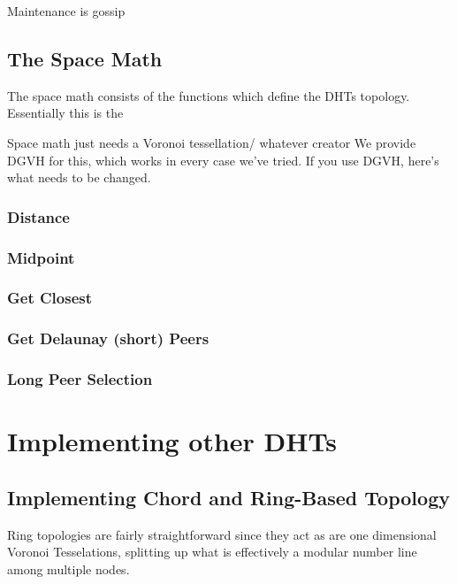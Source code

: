 \documentclass[11pt,conference]{IEEEtran}
\begin{document}
	Maintenance is gossip
	\subsection{The Space Math}
	The space math consists of the functions which define the DHTs topology.
	Essentially this is the
	
	Space math just needs a Voronoi tessellation/ whatever creator
	We provide DGVH for this, which works in every case we've tried.
	If you use DGVH, here's what needs to be changed.
	
	
	\subsubsection{Distance}
	\subsubsection{Midpoint}
	\subsubsection{Get Closest}
	\subsubsection{Get Delaunay (short) Peers}
	\subsubsection{Long Peer Selection}
	
	
	
	


\section{Implementing other DHTs}
\label{sec:implement}
	\subsection{Implementing Chord and Ring-Based Topology}
	
	Ring topologies are fairly straightforward since they act as are one dimensional Voronoi Tesselations, splitting up what is effectively a modular number line among multiple nodes.
	
\end{document}

